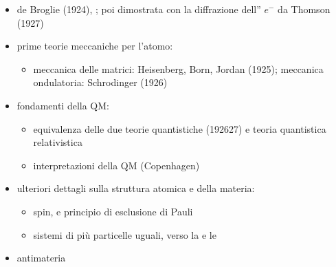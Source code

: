 \documentclass[letterpaper,10pt,italian]{jupyterBook}
\begin{document}
\sphinxAtStartPar
{}

\sphinxAtStartPar
{}
\begin{itemize}
\item {} 
\sphinxAtStartPar
de Broglie (1924), ; poi dimostrata con la diffrazione dell” \(e^-\) da Thomson (1927)

\item {} 
\sphinxAtStartPar
prime teorie meccaniche per l’atomo:
\begin{itemize}
\item {} 
\sphinxAtStartPar
meccanica delle matrici: Heisenberg, Born, Jordan (1925); meccanica ondulatoria: Schrodinger (1926)

\end{itemize}

\item {} 
\sphinxAtStartPar
fondamenti della QM:
\begin{itemize}
\item {} 
\sphinxAtStartPar
equivalenza delle due teorie quantistiche (1926\sphinxhyphen{}27) e teoria quantistica relativistica

\item {} 
\sphinxAtStartPar
interpretazioni della QM (Copenhagen)

\end{itemize}

\item {} 
\sphinxAtStartPar
ulteriori dettagli sulla struttura atomica e della materia:
\begin{itemize}
\item {} 
\sphinxAtStartPar
spin, e principio di esclusione di Pauli

\item {} 
\sphinxAtStartPar
sistemi di più particelle uguali, verso la  e le 

\end{itemize}

\item {} 
\sphinxAtStartPar
antimateria

\end{itemize}
\end{document}
